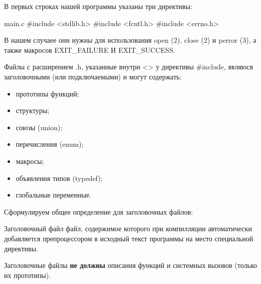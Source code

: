 В первых строках нашей программы указаны три директивы:

	\begin{CCode}{main.c}
			#include <stdlib.h>
			#include <fcntl.h>
			#include <errno.h> \end{CCode}

В нашем случаее они нужны для использования open (2), close (2) и perror (3), а также макросов EXIT\_FAILURE И EXIT\_SUCCESS.

Файлы с расширением .h, указанные внутри <{>} у директивы \#include, являюся заголовочными (или подключаемыми) и могут содержать:
	\begin{itemize}
		\item прототипы функций; 
		\item структуры;
		\item союзы (union);
		\item перечисления (enum);
		\item макросы;
		\item объявления типов (typedef);
		\item глобальные переменные.
	\end{itemize}

Сформулируем общее определение для заголовочных файлов:

\begin{defi}{Заголовочный файл}
	файл, содержимое которого при компилляции автоматически добавляется препроцессором в исходный текст программы на место специальной директивы.
\end{defi}

\begin{important}			
	Заголовочные файлы \textbf{не должны} описания функций и системных вызовов (только их прототипы).
\end{important}
